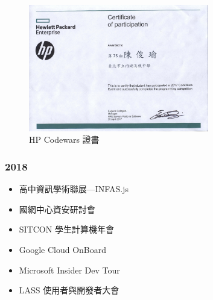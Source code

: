 \documentclass[classical]{einfart}
\providecommand{\tightlist}{%
  \setlength{\itemsep}{0pt}\setlength{\parskip}{0pt}}
\begin{document}
\begin{figure}[H]
    \centering
    \includegraphics[width=0.7\textwidth]{images/2017 HP Codewars.jpg}
    \caption{HP Codewars 證書}
\end{figure}

\subsubsection*{2018}

\begin{itemize}
\tightlist
\item
  高中資訊學術聯展---INFAS.js
\item
  國網中心資安研討會
\item
  SITCON 學生計算機年會
\item
  Google Cloud OnBoard
\item
  Microsoft Insider Dev Tour
\item
  LASS 使用者與開發者大會
\end{itemize}
\end{document}
